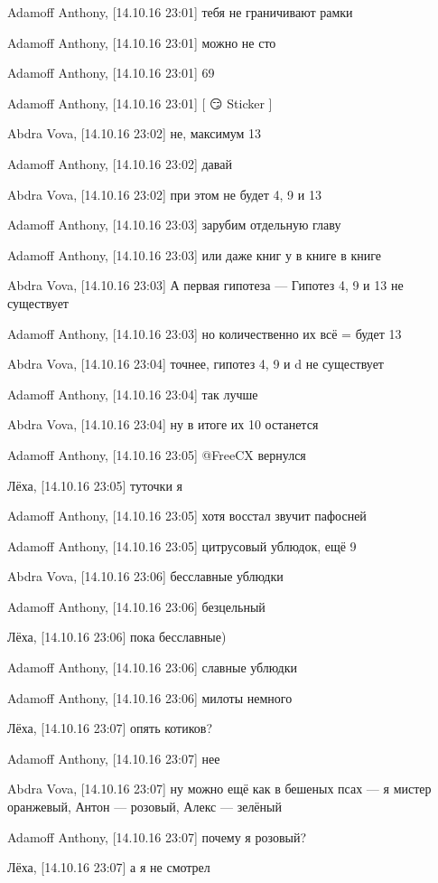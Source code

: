 Adamoff Anthony, [14.10.16 23:01]
тебя не граничивают рамки

Adamoff Anthony, [14.10.16 23:01]
можно не сто

Adamoff Anthony, [14.10.16 23:01]
69

Adamoff Anthony, [14.10.16 23:01]
[ 😏 Sticker ]

Abdra Vova, [14.10.16 23:02]
не, максимум 13

Adamoff Anthony, [14.10.16 23:02]
давай

Abdra Vova, [14.10.16 23:02]
при этом не будет 4, 9 и 13

Adamoff Anthony, [14.10.16 23:03]
зарубим отдельную главу

Adamoff Anthony, [14.10.16 23:03]
или даже книг у в книге в книге

Abdra Vova, [14.10.16 23:03]
А первая гипотеза — Гипотез 4, 9 и 13 не существует

Adamoff Anthony, [14.10.16 23:03]
но количественно их всё = будет 13

Abdra Vova, [14.10.16 23:04]
точнее, гипотез 4, 9  и d не существует

Adamoff Anthony, [14.10.16 23:04]
так лучше

Abdra Vova, [14.10.16 23:04]
ну в итоге их 10 останется

Adamoff Anthony, [14.10.16 23:05]
@FreeCX вернулся

Лёха, [14.10.16 23:05]
туточки я

Adamoff Anthony, [14.10.16 23:05]
хотя восстал звучит пафосней

Adamoff Anthony, [14.10.16 23:05]
цитрусовый ублюдок, ещё 9

Abdra Vova, [14.10.16 23:06]
бесславные ублюдки

Adamoff Anthony, [14.10.16 23:06]
безцельный

Лёха, [14.10.16 23:06]
пока бесславные)

Adamoff Anthony, [14.10.16 23:06]
славные ублюдки

Adamoff Anthony, [14.10.16 23:06]
милоты немного

Лёха, [14.10.16 23:07]
опять котиков?

Adamoff Anthony, [14.10.16 23:07]
нее

Abdra Vova, [14.10.16 23:07]
ну можно ещё как в бешеных псах — я мистер оранжевый, Антон — розовый, Алекс — зелёный

Adamoff Anthony, [14.10.16 23:07]
почему я розовый?

Лёха, [14.10.16 23:07]
а я не смотрел

